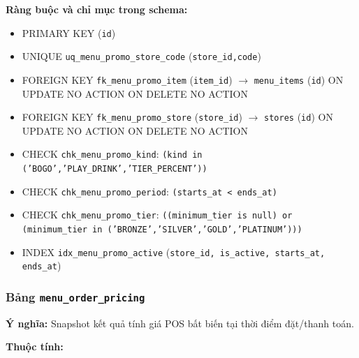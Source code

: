 \textbf{Ràng buộc và chỉ mục trong schema:}

\begin{itemize}

\item PRIMARY KEY (\texttt{id})

\item UNIQUE \texttt{uq\_menu\_promo\_store\_code} (\texttt{store\_id,code})

\item FOREIGN KEY \texttt{fk\_menu\_promo\_item} (\texttt{item\_id}) $\rightarrow$ \texttt{menu\_items} (\texttt{id}) ON UPDATE NO ACTION ON DELETE NO ACTION

\item FOREIGN KEY \texttt{fk\_menu\_promo\_store} (\texttt{store\_id}) $\rightarrow$ \texttt{stores} (\texttt{id}) ON UPDATE NO ACTION ON DELETE NO ACTION

\item CHECK \texttt{chk\_menu\_promo\_kind}: \texttt{(kind in ('BOGO','PLAY\_DRINK','TIER\_PERCENT'))}

\item CHECK \texttt{chk\_menu\_promo\_period}: \texttt{(starts\_at < ends\_at)}

\item CHECK \texttt{chk\_menu\_promo\_tier}: \texttt{((minimum\_tier is null) or (minimum\_tier in ('BRONZE','SILVER','GOLD','PLATINUM')))}

\item INDEX \texttt{idx\_menu\_promo\_active} (\texttt{store\_id, is\_active, starts\_at, ends\_at})

\end{itemize}

\subsubsection{Bảng \texttt{menu\_order\_pricing}}

\textbf{Ý nghĩa:} Snapshot kết quả tính giá POS bất biến tại thời điểm đặt/thanh toán.\par

\textbf{Thuộc tính:}

